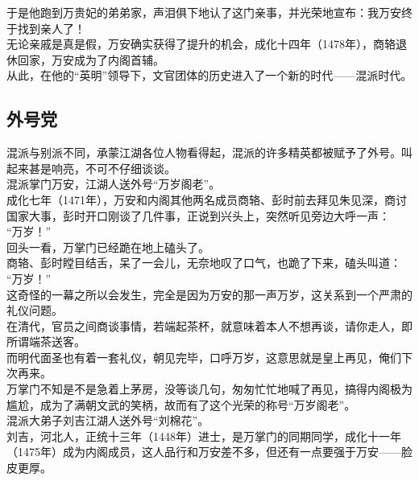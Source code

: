 \begin{multicols}{\theparacolNo}
于是他跑到万贵妃的弟弟家，声泪俱下地认了这门亲事，并光荣地宣布：我万安终于找到亲人了！\\

无论亲戚是真是假，万安确实获得了提升的机会，成化十四年（1478年），商辂退休回家，万安成为了内阁首辅。\\

从此，在他的“英明”领导下，文官团体的历史进入了一个新的时代——混派时代。\\

\subsection{外号党}
混派与别派不同，承蒙江湖各位人物看得起，混派的许多精英都被赋予了外号。叫起来甚是响亮，不可不仔细谈谈。\\

混派掌门万安，江湖人送外号“万岁阁老”。\\

成化七年（1471年），万安和内阁其他两名成员商辂、彭时前去拜见朱见深，商讨国家大事，彭时开口刚谈了几件事，正说到兴头上，突然听见旁边大呼一声：\\

“万岁！”\\

回头一看，万掌门已经跪在地上磕头了。\\

商辂、彭时瞠目结舌，呆了一会儿，无奈地叹了口气，也跪了下来，磕头叫道：\\

“万岁！”\\

这奇怪的一幕之所以会发生，完全是因为万安的那一声万岁，这关系到一个严肃的礼仪问题。\\

在清代，官员之间商谈事情，若端起茶杯，就意味着本人不想再谈，请你走人，即所谓端茶送客。\\

而明代面圣也有着一套礼仪，朝见完毕，口呼万岁，这意思就是皇上再见，俺们下次再来。\\

万掌门不知是不是急着上茅房，没等谈几句，匆匆忙忙地喊了再见，搞得内阁极为尴尬，成为了满朝文武的笑柄，故而有了这个光荣的称号“万岁阁老”。\\

混派大弟子刘吉江湖人送外号“刘棉花”。\\

刘吉，河北人，正统十三年（1448年）进士，是万掌门的同期同学，成化十一年（1475年）成为内阁成员，这人品行和万安差不多，但还有一点要强于万安——脸皮更厚。\\


\end{multicols}

